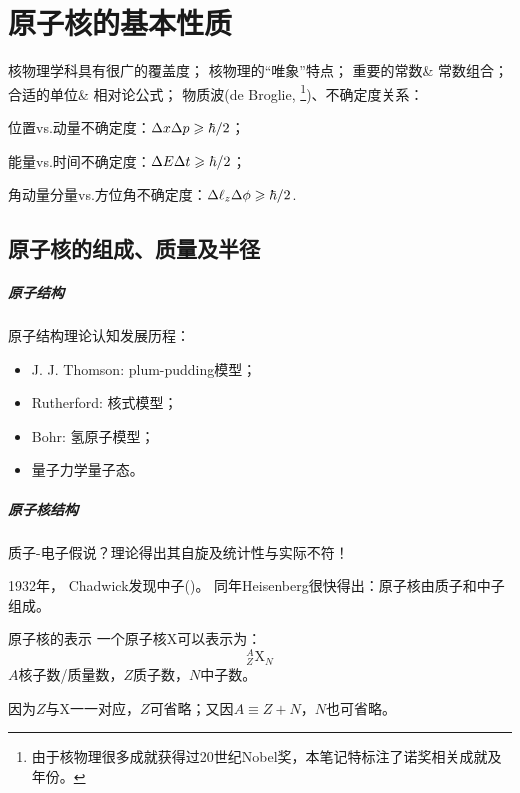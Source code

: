 \chapter{原子核的基本性质}

核物理学科具有很广的覆盖度；
核物理的“唯象”特点；
重要的常数\& 常数组合；
合适的单位\& 相对论公式；
物质波(de Broglie, \footnote{由于核物理很多成就获得过20世纪Nobel奖，本笔记特标注了诺奖相关成就及年份。})、不确定度关系：
\begin{compactenum}
	\item 位置vs.动量不确定度：$\Delta x\Delta p\geqslant\hbar/2$；
	\item 能量vs.时间不确定度：$\Delta E\Delta t\geqslant\hbar/2$；
	\item 角动量分量vs.方位角不确定度：$\Delta \ell_z\Delta\phi\geqslant\hbar/2$.
\end{compactenum}

\section{原子核的组成、质量及半径}

\paragraph{原子结构}原子结构理论认知发展历程：
\begin{itemize}
	\item J. J. Thomson: plum-pudding模型；
	\item Rutherford: 核式模型；
	\item Bohr: 氢原子模型；
	\item 量子力学量子态。
\end{itemize}
\paragraph{原子核结构}
质子-电子假说？理论得出其自旋及统计性与实际不符！

1932年， Chadwick发现中子()。
同年Heisenberg很快得出：原子核由质子和中子组成。

\begin{definition}{原子核的表示}{}
	一个原子核X可以表示为：
	\[
		_Z^A\mathrm X_N
	\]
	$A$核子数/质量数，$Z$质子数，$N$中子数。
	
	因为$Z$与X一一对应，$Z$可省略；又因$A\equiv Z+N$，$N$也可省略。
\end{definition}

